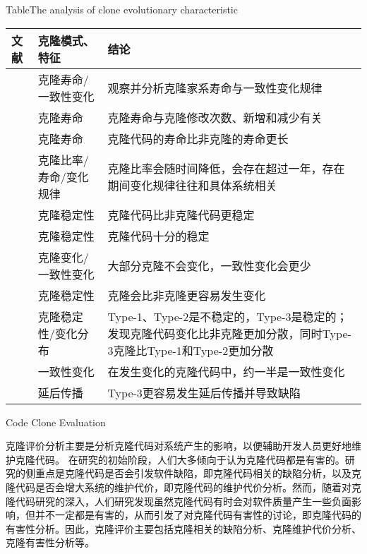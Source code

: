 \begin{table}[htbp]
\centering
{}
{Table$\!$}{The analysis of clone evolutionary characteristic}
\vspace{0.5em}
\wuhao
\begin{tabularx}{0.9\textwidth}{llX}
\toprule[1.5pt]
文献&克隆模式、特征&结论\\
\midrule[1pt]
\cite{kim2005empirical}&	克隆寿命/一致性变化	&观察并分析克隆家系寿命与一致性变化规律\\
\cite{cai2011empirical}&	克隆寿命&	克隆寿命与克隆修改次数、新增和减少有关\\
\cite{krinke2011cloned}&	克隆寿命&	克隆代码的寿命比非克隆的寿命更长\\
\cite{bazrafshan2012evolution}\cite{gode2009evolution}&	克隆比率/寿命/变化规律	&克隆比率会随时间降低，会存在超过一年，存在期间变化规律往往和具体系统相关\\
\hline
\cite{krinke2008cloned}&克隆稳定性&	克隆代码比非克隆代码更稳定\\
\cite{gode2011clone}\cite{harder2013cloned}&	克隆稳定性&	克隆代码十分的稳定\\
\cite{gode2011frequency}&	克隆变化/一致性变化&	大部分克隆不会变化，一致性变化会更少\\
\cite{rahman2014change}&	克隆稳定性&	克隆会比非克隆更容易发生变化\\
\cite{mondal2012comparative}\cite{mondal2012dispersion}&	克隆稳定性/变化分布&	Type-1、Type-2是不稳定的，Type-3是稳定的；发现克隆代码变化比非克隆更加分散，同时Type-3克隆比Type-1和Type-2更加分散\\
\hline
\cite{krinke2007study}&	一致性变化&	在发生变化的克隆代码中，约一半是一致性变化\\
\cite{mondal2016comparative}&	延后传播&	Type-3更容易发生延后传播并导致缺陷\\
\bottomrule[1.5pt]
\end{tabularx}
\end{table}

{Code Clone Evaluation}

克隆评价分析主要是分析克隆代码对系统产生的影响，以便辅助开发人员更好地维护克隆代码。%
在研究的初始阶段，人们大多倾向于认为克隆代码都是有害的。研究的侧重点是克隆代码是否会引发软件缺陷，即克隆代码相关的缺陷分析，以及克隆代码是否会增大系统的维护代价，即克隆代码的维护代价分析。然而，随着对克隆代码研究的深入，人们研究发现虽然克隆代码有时会对软件质量产生一些负面影响，但并不一定都是有害的，从而引发了对克隆代码有害性的讨论，即克隆代码的有害性分析。因此，克隆评价主要包括克隆相关的缺陷分析、克隆维护代价分析、克隆有害性分析等。

